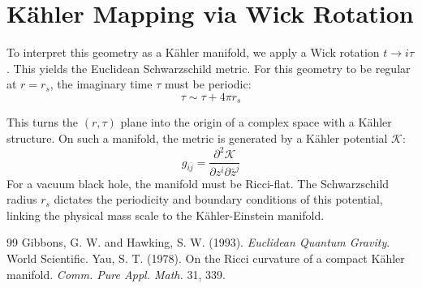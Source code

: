 \documentclass[11pt, letterpaper]{article}
\newcommand{\rs}{r_s}
\begin{document}
\section{K{\"a}hler Mapping via Wick Rotation}
To interpret this geometry as a K{\"a}hler manifold, we apply a Wick rotation $t \to i\tau$. This yields the Euclidean Schwarzschild metric. For this geometry to be regular at $r = \rs$, the imaginary time $\tau$ must be periodic:
\begin{equation}
    \tau \sim \tau + 4\pi \rs
\end{equation}



This turns the $(r, \tau)$ plane into the origin of a complex space with a K{\"a}hler structure. On such a manifold, the metric is generated by a K{\"a}hler potential $\mathcal{K}$:
\begin{equation}
    g_{i\bar{j}} = \frac{\partial^2 \mathcal{K}}{\partial z^i \partial \bar{z}^j}
\end{equation}
For a vacuum black hole, the manifold must be Ricci-flat. The Schwarzschild radius $\rs$ dictates the periodicity and boundary conditions of this potential, linking the physical mass scale to the K{\"a}hler-Einstein manifold.

\begin{thebibliography}{99}
 Gibbons, G. W. and Hawking, S. W. (1993). \textit{Euclidean Quantum Gravity}. World Scientific.
 Yau, S. T. (1978). On the Ricci curvature of a compact K{\"a}hler manifold. \textit{Comm. Pure Appl. Math.} 31, 339.
\end{thebibliography}
\end{document}
